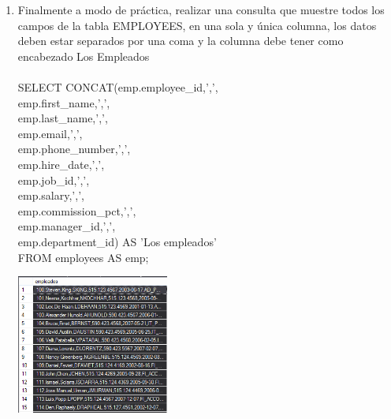 \begin{enumerate}[1.]
	\item Finalmente a modo de práctica, realizar una consulta que muestre todos los campos de la tabla EMPLOYEES, en una sola y única columna, los datos deben estar separados por una coma y la columna debe tener como encabezado Los Empleados
	\\
	\\SELECT CONCAT(emp.employee\_id,',', \\
			  emp.first\_name,',', \\
			  emp.last\_name,',', \\
			  emp.email,',', \\
			  emp.phone\_number,',', \\
			  emp.hire\_date,',', \\
			  emp.job\_id,',', \\
			  emp.salary,',', \\
			  emp.commission\_pct,',', \\
			  emp.manager\_id,',', \\
			  emp.department\_id) AS 'Los empleados' \\
	FROM employees AS emp; \\
	\begin{center}
	\includegraphics[width=5cm]{./Imagenes/433} 
	\end{center}

\end{enumerate}



